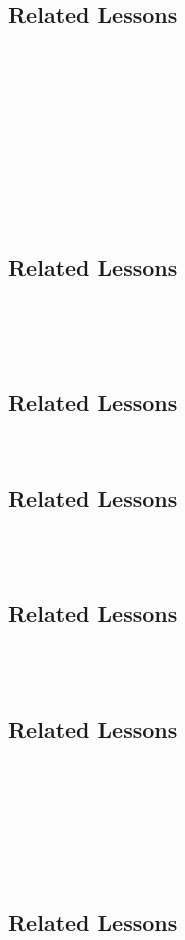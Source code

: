 \subsection{Related Lessons}
\fourdTen{}\\
\fourdEleven{}\\
\fourdTwelve{}\\
\fourdThirteen{}\\
\fourdFourteen{}\\
\fourFKFourtyThree{}\\
\fourFKFourtyFour{}\\
\fourFKFourtyFive{}\\
\fourFKFourtySix{}\\
%
\subsection{Related Lessons}
\fourdOne{}\\
\fourdFour{}\\
\fourFKFourtyThree{}\\
%
\subsection{Related Lessons}
\fourFKFourtyFour{}\\
%
\subsection{Related Lessons}
\fourdTwelve{}\\
\fourFKFourtyFive{}\\
%
\subsection{Related Lessons}
\fourdThirteen{}\\
\fourFKFourtySix{}\\
%
\subsection{Related Lessons}
\fourdTen{}\\
\fourdThirteen{}\\
\fourFKFourtyThree{}\\
\fourFKFourtyFour{}\\
\fourFKFourtyFive{}\\
\fourFKFourtySix{}\\
%
\subsection{Related Lessons}
\fourdFour{}\\
\fourdTen{}\\
%
